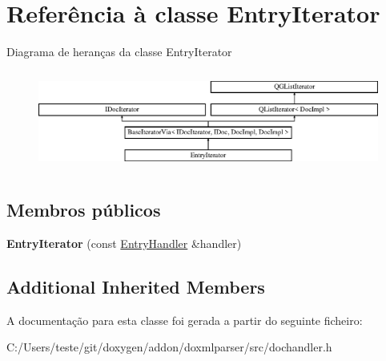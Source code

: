 \hypertarget{class_entry_iterator}{\section{Referência à classe Entry\-Iterator}
\label{class_entry_iterator}
}
Diagrama de heranças da classe Entry\-Iterator\begin{figure}[H]
\begin{center}
\leavevmode
\includegraphics[height=3.294118cm]{class_entry_iterator}
\end{center}
\end{figure}
\subsection*{Membros públicos}
\begin{DoxyCompactItemize}
\item 
\hypertarget{class_entry_iterator_aed035ecad00ade946166bd2c293cfbe0}{{\bfseries Entry\-Iterator} (const \hyperlink{class_entry_handler}{Entry\-Handler} \&handler)}\label{class_entry_iterator_aed035ecad00ade946166bd2c293cfbe0}

\end{DoxyCompactItemize}
\subsection*{Additional Inherited Members}


A documentação para esta classe foi gerada a partir do seguinte ficheiro\-:\begin{DoxyCompactItemize}
\item 
C\-:/\-Users/teste/git/doxygen/addon/doxmlparser/src/dochandler.\-h\end{DoxyCompactItemize}
